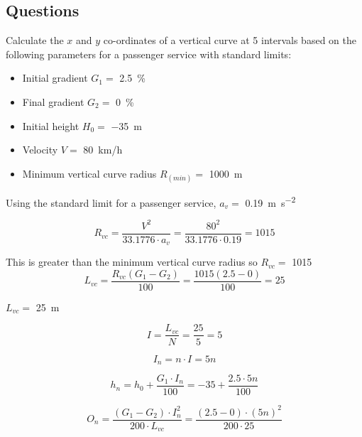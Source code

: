 \documentclass{bcrre_exam}
\begin{document}
\subsection*{Questions}
\begin{questions}

\question
Calculate the $x$ and $y$ co-ordinates of a vertical curve at \num{5} intervals based on the following parameters for a passenger service with standard limits:
\begin{itemize}
    \item Initial gradient $G_1=$ \qty{2.5}{\percent}
    \item Final gradient $G_2=$ \qty{0}{\percent}
    \item Initial height $H_0=$ \qty{-35}{m}
    \item Velocity $V=$ \qty{80}{km/h}
    \item Minimum vertical curve radius $R_{(min)}=$ \qty{1000}{m}
\end{itemize}

\begin{solution}
Using the standard limit for a passenger service, $a_v=$ \qty{0.19}{\meter \per \second \squared}

\begin{equation}
    R_{vc}=\frac{V^2}{33.1776 \cdot a_v}=\frac{80^2}{33.1776 \cdot 0.19} = 1015
\end{equation}

This is greater than the minimum vertical curve radius so $R_{vc}=$ \qty{1015}.

\begin{equation}
    L_{vc} = \frac{R_{vc}(G_1-G_2)}{100}=\frac{1015(2.5-0)}{100}=25
\end{equation}

$L_{vc}=$ \qty{25}{m}

\begin{equation}
    I = \frac{L_{vc}}{N} = \frac{25}{5} = 5
\end{equation}

\begin{equation}
    I_n = n \cdot I = 5n
\end{equation}

\begin{equation}
    h_n = h_0 + \frac{G_1 \cdot I_n}{100}=-35+\frac{2.5 \cdot 5n}{100}
\end{equation}

\begin{equation}
    O_n = \frac{(G_1-G_2) \cdot I_n^2}{200 \cdot L_{vc}} = \frac{(2.5-0)\cdot (5n)^2}{200 \cdot 25}
\end{equation}


\end{solution}
\end{questions}
\end{document}
